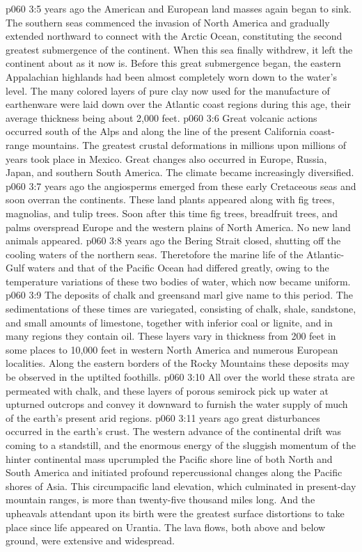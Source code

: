 \pc \vs p060 3:5  years ago the American and European land masses again began to sink. The southern seas commenced the invasion of North America and gradually extended northward to connect with the Arctic Ocean, constituting the second greatest submergence of the continent. When this sea finally withdrew, it left the continent about as it now is. Before this great submergence began, the eastern Appalachian highlands had been almost completely worn down to the water’s level. The many colored layers of pure clay now used for the manufacture of earthenware were laid down over the Atlantic coast regions during this age, their average thickness being about 2,000 feet.
\vs p060 3:6 Great volcanic actions occurred south of the Alps and along the line of the present California coast\hyp{}range mountains. The greatest crustal deformations in millions upon millions of years took place in Mexico. Great changes also occurred in Europe, Russia, Japan, and southern South America. The climate became increasingly diversified.
\pc \vs p060 3:7  years ago the angiosperms emerged from these early Cretaceous seas and soon overran the continents. These land plants  appeared along with fig trees, magnolias, and tulip trees. Soon after this time fig trees, breadfruit trees, and palms overspread Europe and the western plains of North America. No new land animals appeared.
\pc \vs p060 3:8  years ago the Bering Strait closed, shutting off the cooling waters of the northern seas. Theretofore the marine life of the Atlantic\hyp{}Gulf waters and that of the Pacific Ocean had differed greatly, owing to the temperature variations of these two bodies of water, which now became uniform.
\vs p060 3:9 The deposits of chalk and greensand marl give name to this period. The sedimentations of these times are variegated, consisting of chalk, shale, sandstone, and small amounts of limestone, together with inferior coal or lignite, and in many regions they contain oil. These layers vary in thickness from 200 feet in some places to 10,000 feet in western North America and numerous European localities. Along the eastern borders of the Rocky Mountains these deposits may be observed in the uptilted foothills.
\vs p060 3:10 All over the world these strata are permeated with chalk, and these layers of porous semirock pick up water at upturned outcrops and convey it downward to furnish the water supply of much of the earth’s present arid regions.
\pc \vs p060 3:11  years ago great disturbances occurred in the earth’s crust. The western advance of the continental drift was coming to a standstill, and the enormous energy of the sluggish momentum of the hinter continental mass upcrumpled the Pacific shore line of both North and South America and initiated profound repercussional changes along the Pacific shores of Asia. This circumpacific land elevation, which culminated in present\hyp{}day mountain ranges, is more than twenty\hyp{}five thousand miles long. And the upheavals attendant upon its birth were the greatest surface distortions to take place since life appeared on Urantia. The lava flows, both above and below ground, were extensive and widespread.
